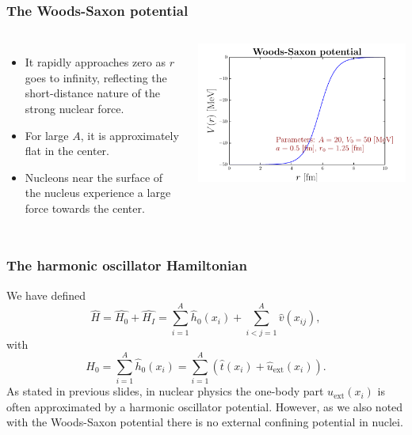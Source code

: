 \documentclass[compress]{beamer}
\begin{document}
\frame
    {
      \frametitle{The Woods-Saxon potential}
      \begin{footnotesize}
     \begin{columns}
      \column{4.0cm}
\begin{itemize}
\item It rapidly approaches zero as $r$ goes to infinity, reflecting the short-distance nature of the strong nuclear force.
\item For large $A$, it is approximately flat in the center.
\item Nucleons near the surface of the nucleus experience a large force towards the center.
\end{itemize}
\column{6cm}
      \begin{center}
	\includegraphics[width=1.25\textwidth]{woodsaxon.pdf}
      \end{center}
\end{columns}
      \end{footnotesize}
    }


\frame
{
  \frametitle{The harmonic oscillator Hamiltonian}
\begin{small}
{\scriptsize
We have defined
\[
    \hat{H} = \hat{H_0} + \hat{H_I} 
    = \sum_{i=1}^A \hat{h}_0(x_i) + \sum_{i<j=1}^A \hat{v}(x_{ij}),
\]
with 
\[
  H_0=\sum_{i=1}^A \hat{h}_0(x_i) =  \sum_{i=1}^A\left(\hat{t}(x_i) + \hat{u}_{\mathrm{ext}}(x_i)\right).
\]
As stated in previous slides, 
in nuclear physics the one-body part $u_{\mathrm{ext}}(x_i)$ is often 
approximated by a harmonic oscillator potential. However,  as we also noted with the Woods-Saxon potential there is no 
external confining potential in nuclei. 
}
\end{small}
}
\end{document}
